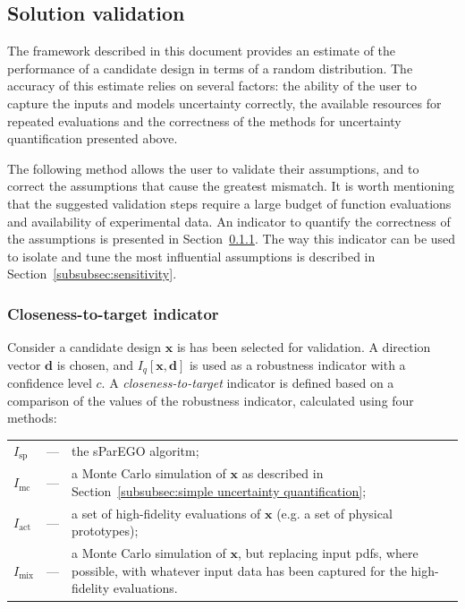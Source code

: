 \documentclass[10pt]{llncs}
\newcommand{\Iq}[1]{\ensuremath{I_q\!\left[{#1}\right]}} %
\newcommand{\vx}{\ensuremath{\mathbf{x}}} %
\newcommand{\vd}{\ensuremath{\mathbf{d}}} %
\begin{document}
\subsection{Solution validation}
\label{subsec:validation}
The framework described in this document provides an estimate of the performance of a candidate design in terms of a random distribution. The accuracy of this estimate relies on several factors: the ability of the user to capture the inputs and models uncertainty correctly, the available resources for repeated evaluations and the correctness of the methods for uncertainty quantification presented above.

The following method allows the user to validate their assumptions, and to correct the assumptions that cause the greatest mismatch. It is worth mentioning that the suggested validation steps require a large budget of function evaluations and availability of experimental data.
An indicator to quantify the correctness of the assumptions is presented in Section~\ref{subsubsec:closeness-to-target}. The way this indicator can be used to isolate and tune the most influential assumptions is described in Section~\ref{subsubsec:sensitivity}.

\subsubsection{Closeness-to-target indicator}
\label{subsubsec:closeness-to-target}
Consider a candidate design $\vx$ is has been selected for validation. A direction vector $\vd$ is chosen, and $\Iq{\vx,\vd}$ is used as a robustness indicator with a confidence level $c$. A \textit{closeness-to-target} indicator is defined based on a comparison of the values of the robustness indicator, calculated using four methods:

\medskip\noindent
\begin{tabularx}{\textwidth}{lcX}
$I_\text{sp}$	& --- & the sParEGO algoritm;\\
$I_\text{mc}$	& --- & a Monte Carlo simulation of $\vx$ as described in Section~\ref{subsubsec:simple uncertainty quantification};\\
$I_\text{act}$	& --- & a set of high-fidelity evaluations of $\vx$ (e.g. a set of physical prototypes);\\
$I_\text{mix}$	& --- & a Monte Carlo simulation of $\vx$, but replacing input pdfs, where possible, with whatever input data has been captured for the high-fidelity evaluations.
\end{tabularx}
\end{document}
